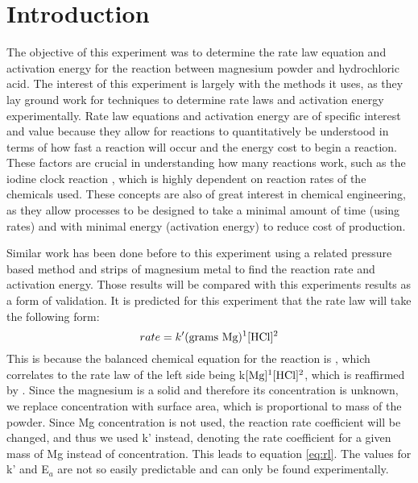 \documentclass[12pt, letterpaper]{article}
\begin{document}
\section{Introduction}\doublespacing
The objective of this experiment was to determine the rate law equation and activation energy for the reaction between magnesium powder and hydrochloric acid. The interest of this experiment is largely with the methods it uses, as they lay ground work for techniques to determine rate laws and activation energy experimentally. Rate law equations and activation energy are of specific interest and value because they allow for reactions to quantitatively be understood in terms of how fast a reaction will occur and the energy cost to begin a reaction. These factors are crucial in understanding how many reactions work, such as the iodine clock reaction \cite{clock}, which is highly dependent on reaction rates of the chemicals used. These concepts are also of great interest in chemical engineering, as they allow processes to be designed to take a minimal amount of time (using rates) and with minimal energy (activation energy) to reduce cost of production.\\\par

Similar work has been done before to this experiment using a related pressure based method and strips of magnesium metal \cite{mg_hcl} to find the reaction rate and activation energy. Those results will be compared with this experiments results as a form of validation. It is predicted for this experiment that the rate law will take the following form:
\begin{equation}
rate = k'(\textnormal{grams Mg})^1 [\textnormal{HCl}]^2
\label{eq:rl}
\end{equation}
This is because the balanced chemical equation for the reaction is , which correlates to the rate law of the left side being k$ [\textnormal{Mg}]^1 [\textnormal{HCl}]^2$, which is reaffirmed by \cite{mg_hcl}. Since the magnesium is a solid and therefore its concentration is unknown, we replace concentration with surface area, which is proportional to mass of the powder. Since Mg concentration is not used, the reaction rate coefficient will be changed, and thus we used k' instead, denoting the rate coefficient for a given mass of Mg instead of concentration. This leads to equation \ref{eq:rl}. The values for k' and E$_a$ are not so easily predictable and can only be found experimentally.\\\par
\end{document}
